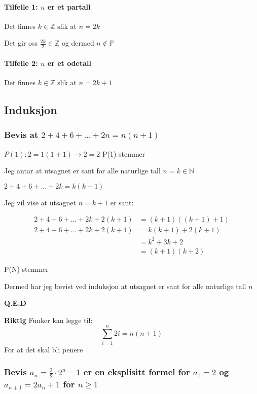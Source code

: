\documentclass{article}
\begin{document}
\paragraph{Tilfelle 1: $n$ er et partall}

Det finnes $k \in \mathbb{Z}$ slik at $n=2k$

Det gir oss $\frac{2k}{2} \in \mathbb{Z}$ og dermed $n \notin \mathbb{P}$

\paragraph{Tilfelle 2: $n$ er et odetall}

Det finnes $k \in \mathbb{Z}$ slik at $n=2k+1$

\subsection{Induksjon}

\subsubsection{Bevis at $2+4+6+...+2n=n(n+1)$}

$P(1): 2=1(1+1) \rightarrow 2=2$ P(1) stemmer 

Jeg antar at utsagnet er sant for alle naturlige tall $n=k \in \mathbb{N}$

$2+4+6+...+2k=k(k+1)$

Jeg vil vise at utsagnet $n = k + 1$ er sant:

\begin{align*}
    2+4+6+...+2k+2(k+1) &= (k+1)((k+1) + 1) \\
    2+4+6+...+2k+2(k+1) &= k(k+1)+2(k+1) \\
    &= k^2+3k+2 \\
    &= (k+1)(k+2)
\end{align*}

P(N) stemmer

Dermed har jeg bevist ved induksjon at utsagnet er sant for alle naturlige tall $n$

\textbf{Q.E.D}

\textbf{Riktig}
Funker kan legge til:
\[
\sum_{i=1}^{n} 2i = n(n + 1)
\]
For at det skal bli penere

\subsubsection{Bevis $a_n=\frac{3}{2} \cdot 2^n -1$ er en eksplisitt formel for $a_1=2$ og $a_{n+1}=2a_n+1$ for $n \ge 1$}
\end{document}
